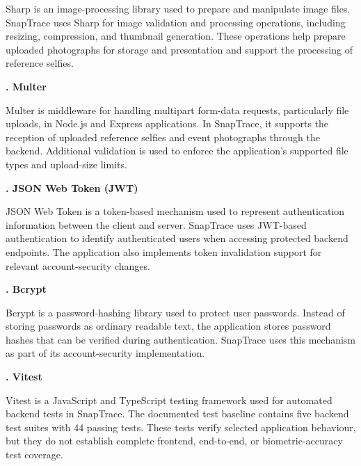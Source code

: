 \vspace{0.2cm}
\par \noindent Sharp is an image-processing library used to prepare and manipulate image files. SnapTrace uses Sharp for image validation and processing operations, including resizing, compression, and thumbnail generation. These operations help prepare uploaded photographs for storage and presentation and support the processing of reference selfies.
\clearpage
\vspace*{0.5cm}
{ \noindent \bfseries \fontsize{14pt}{15pt}. Multer
    \par}
\vspace{0.2cm}
\par \noindent Multer is middleware for handling multipart form-data requests, particularly file uploads, in Node.js and Express applications. In SnapTrace, it supports the reception of uploaded reference selfies and event photographs through the backend. Additional validation is used to enforce the application's supported file types and upload-size limits.

\vspace{0.4cm}
{ \noindent \bfseries \fontsize{14pt}{15pt}. JSON Web Token (JWT)
    \par}

\vspace{0.2cm}
\par \noindent JSON Web Token is a token-based mechanism used to represent authentication information between the client and server. SnapTrace uses JWT-based authentication to identify authenticated users when accessing protected backend endpoints. The application also implements token invalidation support for relevant account-security changes.

\vspace{0.4cm}
{ \noindent \bfseries \fontsize{14pt}{15pt}. Bcrypt
    \par}

\vspace{0.2cm}
\par \noindent Bcrypt is a password-hashing library used to protect user passwords. Instead of storing passwords as ordinary readable text, the application stores password hashes that can be verified during authentication. SnapTrace uses this mechanism as part of its account-security implementation.

\vspace{0.4cm}
{ \noindent \bfseries \fontsize{14pt}{15pt}. Vitest
    \par}
\vspace{0.2cm}
\par \noindent Vitest is a JavaScript and TypeScript testing framework used for automated backend tests in SnapTrace. The documented test baseline contains five backend test suites with 44 passing tests. These tests verify selected application behaviour, but they do not establish complete frontend, end-to-end, or biometric-accuracy test coverage.

